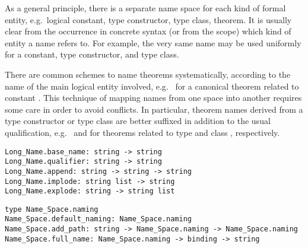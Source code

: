 \begin{isabellebody}
\begin{isamarkuptext}
  \medskip As a general principle, there is a separate name space for
  each kind of formal entity, e.g.\ logical constant, type
  constructor, type class, theorem.  It is usually clear from the
  occurrence in concrete syntax (or from the scope) which kind of
  entity a name refers to.  For example, the very same name  may be used uniformly for a constant, type constructor, and
  type class.

  There are common schemes to name theorems systematically, according
  to the name of the main logical entity involved, e.g.\  for a canonical theorem related to constant .
  This technique of mapping names from one space into another requires
  some care in order to avoid conflicts.  In particular, theorem names
  derived from a type constructor or type class are better suffixed in
  addition to the usual qualification, e.g.\ 
  and  for theorems related to type 
  and class , respectively.%
\end{isamarkuptext}%
\isamarkuptrue%
%
\isadelimmlref
%
\endisadelimmlref
%
\isatagmlref
%
\begin{isamarkuptext}%
\begin{mldecls}
  \verb|Long_Name.base_name: string -> string| \\
  \verb|Long_Name.qualifier: string -> string| \\
  \verb|Long_Name.append: string -> string -> string| \\
  \verb|Long_Name.implode: string list -> string| \\
  \verb|Long_Name.explode: string -> string list| \\
  \end{mldecls}
  \begin{mldecls}
  \verb|type Name_Space.naming| \\
  \verb|Name_Space.default_naming: Name_Space.naming| \\
  \verb|Name_Space.add_path: string -> Name_Space.naming -> Name_Space.naming| \\
  \verb|Name_Space.full_name: Name_Space.naming -> binding -> string| \\

\end{mldecls}
\end{isamarkuptext}
\end{isabellebody}
